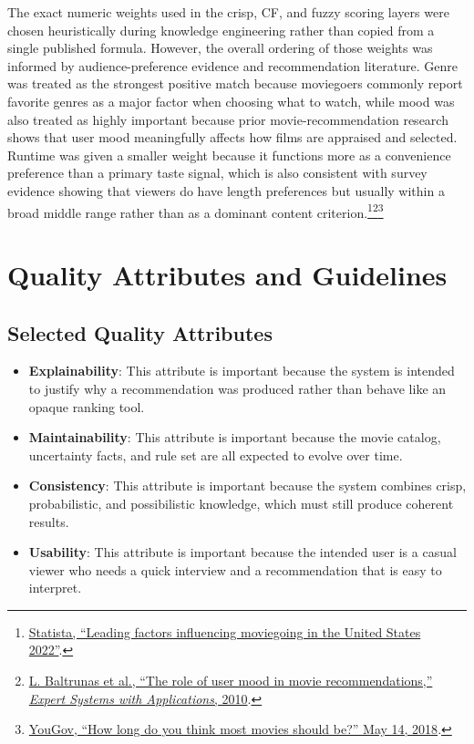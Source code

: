 \documentclass[11pt]{article}
\begin{document}
The exact numeric weights used in the crisp, CF, and fuzzy scoring layers were chosen heuristically during knowledge engineering rather than copied from a single published formula. However, the overall ordering of those weights was informed by audience-preference evidence and recommendation literature. Genre was treated as the strongest positive match because moviegoers commonly report favorite genres as a major factor when choosing what to watch, while mood was also treated as highly important because prior movie-recommendation research shows that user mood meaningfully affects how films are appraised and selected. Runtime was given a smaller weight because it functions more as a convenience preference than a primary taste signal, which is also consistent with survey evidence showing that viewers do have length preferences but usually within a broad middle range rather than as a dominant content criterion.\footnote{\href{https://www.statista.com/statistics/1334674/factors-influencing-moviegoing-united-states/}{Statista, ``Leading factors influencing moviegoing in the United States 2022''}.}\footnote{\href{https://www.sciencedirect.com/science/article/pii/S0957417410001569}{L. Baltrunas et al., ``The role of user mood in movie recommendations,'' \textit{Expert Systems with Applications}, 2010}.}\footnote{\href{https://today.yougov.com/topics/society/survey-results/daily/2018/05/14/a7f00/2}{YouGov, ``How long do you think most movies should be?'' May 14, 2018}.}

\section{Quality Attributes and Guidelines}

\subsection{Selected Quality Attributes}
\begin{itemize}
  \item \textbf{Explainability}: This attribute is important because the system is intended to justify why a recommendation was produced rather than behave like an opaque ranking tool.
  \item \textbf{Maintainability}: This attribute is important because the movie catalog, uncertainty facts, and rule set are all expected to evolve over time.
  \item \textbf{Consistency}: This attribute is important because the system combines crisp, probabilistic, and possibilistic knowledge, which must still produce coherent results.
  \item \textbf{Usability}: This attribute is important because the intended user is a casual viewer who needs a quick interview and a recommendation that is easy to interpret.
\end{itemize}
\end{document}
